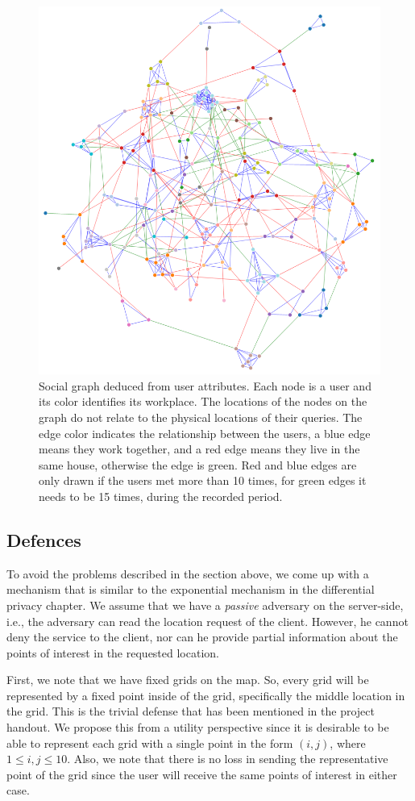 \documentclass[9pt,conference]{IEEEtran}
\begin{document}
\begin{figure}
    \centering
    \includegraphics[width=.8\linewidth]{images/social_graph.png}
    \caption{Social graph deduced from user attributes. Each node is a user and its color identifies its workplace. The locations of the nodes on the graph do not relate to the physical locations of their queries. The edge color indicates the relationship between the users, a blue edge means they work together, and a red edge means they live in the same house, otherwise the edge is green. Red and blue edges are only drawn if the users met more than 10 times, for green edges it needs to be 15 times, during the recorded period.}
    \label{fig:social-graph}
\end{figure}


\subsection{Defences}

To avoid the problems described in the section above, we come up with a mechanism that is similar to the exponential mechanism in the differential privacy chapter\cite{TCS-042}. We assume that we have a \textit{passive} adversary on the server-side, i.e., the adversary can read the location request of the client. However, he cannot deny the service to the client, nor can he provide partial information about the points of interest in the requested location.

First, we note that we have fixed grids on the map. So, every grid will be represented by a fixed point inside of the grid, specifically the middle location in the grid. This is the trivial defense that has been mentioned in the project handout. We propose this from a utility perspective since it is desirable to be able to represent each grid with a single point in the form $(i,j)$, where $1 \leq i,j \leq 10$. Also, we note that there is no loss in sending the representative point of the grid since the user will receive the same points of interest in either case.
\end{document}

